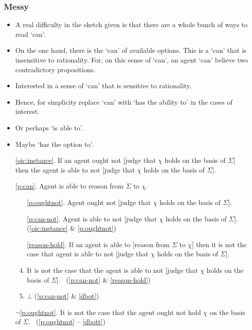 \documentclass[10pt]{article}
\begin{document}
\subsubsection{Messy}
\label{sec:messy}

\begin{itemize}
\item A real difficulty in the sketch given is that there are a whole bunch of ways to read `can'.
\item On the one hand, there is the `can' of available options.
  This is a `can' that is insensitive to rationality.
  For, on this sense of `can', an agent `can' believe two contradictory propositions.
\item Interested in a sense of `can' that is sensitive to rationality, 
\item Hence, for simplicity replace `can' with `has the ability to' in the cases of interest.
\item Or perhaps `is able to'.
\item Maybe `has the option to'.
\end{itemize}

\begin{enumerate}
\item[\ref{oic:instance}.] If an agent ought not [judge that \(\chi\) holds on the basis of \(\Sigma\)] then the agent is able to not [judge that \(\chi\) holds on the basis of \(\Sigma\)].
\item[\ref{p:can}.] Agent is able to reason from \(\Sigma\) to \(\chi\).
  \begin{enumerate}[ref=\alph*.]
  \item[\ref{p:oughtnot}.] Agent ought not [judge that \(\chi\) holds on the basis of \(\Sigma\)].
  \item[\ref{p:can-not}.] Agent is able to not [judge that \(\chi\) holds on the basis of \(\Sigma\)]. \hfill (\ref{oic:instance} \& \ref{p:oughtnot})
  \item[\ref{reason-hold}.] If an agent is able to [reason from \(\Sigma\) to \(\chi\)] then it is not the case that agent is able to not [judge that \(\chi\) holds on the basis of \(\Sigma\)].
  \item\label{dbot} It is not the case that the agent is able to not [judge that \(\chi\) holds on the basis of \(\Sigma\)].
  \mbox{ }\hfill (\ref{p:can-not} \& \ref{reason-hold})
  \item\label{dbott} \(\bot\) \hfill (\ref{p:can-not} \& \ref{dbot})
  \end{enumerate}
\item[\(\lnot\)\ref{p:oughtnot}.] It is not the case that the agent ought not hold \(\chi\) on the basis of \(\Sigma\).\linebreak
  \mbox{ }\hfill (\ref{p:oughtnot} -- \ref{dbott})
\end{enumerate}
\end{document}
